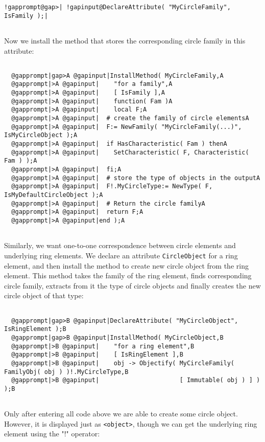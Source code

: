 \documentclass[a4paper,11pt]{report}
\begin{document}
{{\begin{Verbatim}[commandchars=!@|,fontsize=\small,frame=single,label=Example]
  !gapprompt@gap>| !gapinput@DeclareAttribute( "MyCircleFamily", IsFamily );|
  
\end{Verbatim}
 Now we install the method that stores the corresponding circle family in this
attribute: 
\begin{Verbatim}[commandchars=@|A,fontsize=\small,frame=single,label=Example]
  
  @gapprompt|gap>A @gapinput|InstallMethod( MyCircleFamily,A
  @gapprompt|>A @gapinput|    "for a family",A
  @gapprompt|>A @gapinput|    [ IsFamily ],A
  @gapprompt|>A @gapinput|    function( Fam )A
  @gapprompt|>A @gapinput|    local F;A
  @gapprompt|>A @gapinput|  # create the family of circle elementsA
  @gapprompt|>A @gapinput|  F:= NewFamily( "MyCircleFamily(...)", IsMyCircleObject );A
  @gapprompt|>A @gapinput|  if HasCharacteristic( Fam ) thenA
  @gapprompt|>A @gapinput|    SetCharacteristic( F, Characteristic( Fam ) );A
  @gapprompt|>A @gapinput|  fi;A
  @gapprompt|>A @gapinput|  # store the type of objects in the outputA
  @gapprompt|>A @gapinput|  F!.MyCircleType:= NewType( F, IsMyDefaultCircleObject );A
  @gapprompt|>A @gapinput|  # Return the circle familyA
  @gapprompt|>A @gapinput|  return F;A
  @gapprompt|>A @gapinput|end );A
  
\end{Verbatim}
 Similarly, we want one-to-one correspondence between circle elements and
underlying ring elements. We declare an attribute \texttt{CircleObject} for a ring element, and then install the method to create new circle object
from the ring element. This method takes the family of the ring element, finds
corresponding circle family, extracts from it the type of circle objects and
finally creates the new circle object of that type: 
\begin{Verbatim}[commandchars=@|B,fontsize=\small,frame=single,label=Example]
  
  @gapprompt|gap>B @gapinput|DeclareAttribute( "MyCircleObject", IsRingElement );B
  @gapprompt|gap>B @gapinput|InstallMethod( MyCircleObject,B
  @gapprompt|>B @gapinput|    "for a ring element",B
  @gapprompt|>B @gapinput|    [ IsRingElement ],B
  @gapprompt|>B @gapinput|    obj -> Objectify( MyCircleFamily( FamilyObj( obj ) )!.MyCircleType,B
  @gapprompt|>B @gapinput|                      [ Immutable( obj ) ] ) );B
  
\end{Verbatim}
 Only after entering all code above we are able to create some circle object.
However, it is displayed just as \texttt{{\textless}object{\textgreater}}, though we can get the underlying ring element using the "!" operator: 
\begin{Verbatim}[commandchars=@|A,fontsize=\small,frame=single,label=Example]
  

\end{Verbatim}}}
\end{document}
